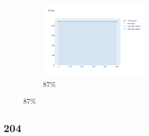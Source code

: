 \documentclass[12pt, fleqn]{report}                             %
\theoremstyle{break}                                            %
\begin{document}
\begin{figure}[ht!]
\begin{subfigure}[b]{0.4\linewidth}
          \includegraphics[width=0.6\textwidth]{Images/200/dia-d.png}
          \caption{87\%}
        \end{subfigure}
      \end{figure}


      \clearpage
      \subsection{204}
\end{document}
